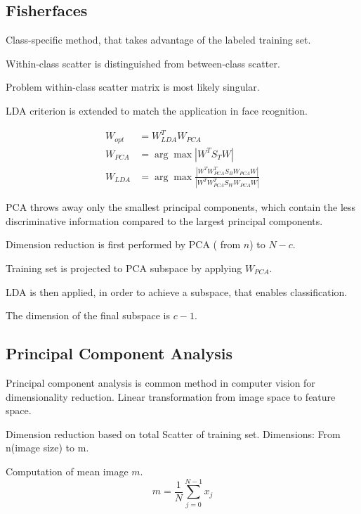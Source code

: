   \subsection{Fisherfaces}
     Class-specific method, that takes advantage of the labeled training set.

    Within-class scatter is distinguished from between-class scatter. 

    Problem within-class scatter matrix is most likely singular.

    LDA criterion is extended to match the application in face rcognition.


    \begin{align}
      W_{opt}& = W^T_{LDA}W_{PCA}\\
      W_{PCA}& =\arg \max |W^T S_T W |\\
      W_{LDA}& =\arg \max \frac{|W^T W^T_{PCA} S_B W_{PCA}W |}{|W^T W^T_{PCA} S_W W_{PCA} W|}
    \end{align}

    PCA throws away only the smallest principal components, which contain the less discriminative information
    compared to the largest principal components.

    Dimension reduction is first performed by PCA ( from $n$) to $N-c$.

    Training set is projected to PCA subspace by applying $W_{PCA}$.

    LDA is then applied, in order to achieve a subspace, that enables classification.

    The dimension of the final subspace is $c-1$.

  \subsection{Principal Component Analysis}
    Principal component analysis is common method in computer vision for dimensionality reduction.
    Linear transformation from image space to feature space.

    Dimension reduction based on total Scatter of training set.
    Dimensions: From n(image size) to m.


    Computation of mean image $m$.
    \begin{equation}
    m=\frac{1}{N}\sum\limits_{j=0}^{N-1}{x_j}
    \end{equation}


